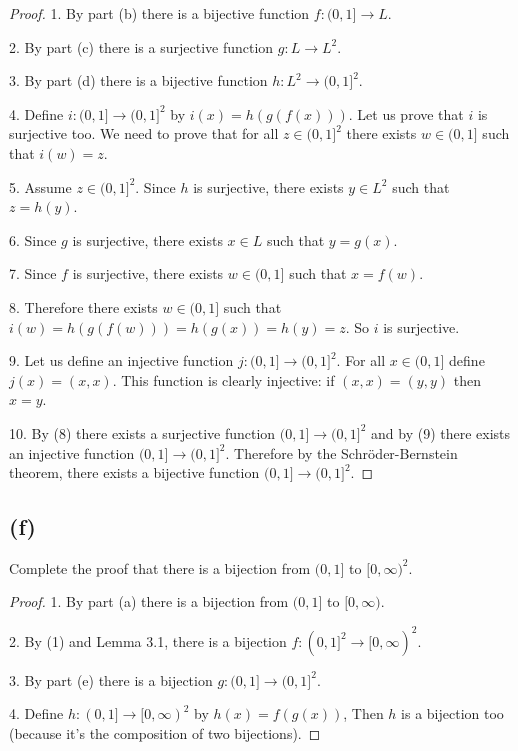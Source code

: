 \documentclass[14pt]{extarticle}
\begin{document}
\begin{proof}
1. By part (b) there is a bijective function $f: (0, 1] \to L$.

2. By part (c) there is a surjective function $g: L \to L^2$.

3. By part (d) there is a bijective function $h: L^2 \to (0,1]^2$.

4. Define $i: (0,1] \to (0,1]^2$ by $i(x) = h(g(f(x)))$. Let us prove that $i$ is surjective too. We need to prove that for all $z \in (0,1]^2$ there exists $w \in (0,1]$ such that $i(w) = z$.

5. Assume $z \in (0,1]^2$. Since $h$ is surjective, there exists $y \in L^2$ such that $z = h(y)$.

6. Since $g$ is surjective, there exists $x \in L$ such that $y = g(x)$.

7. Since $f$ is surjective, there exists $w \in (0,1]$ such that $x = f(w)$.

8. Therefore there exists $w \in (0, 1]$ such that $i(w) = h(g(f(w))) = h(g(x)) = h(y) = z$. So $i$ is surjective.

9. Let us define an injective function $j: (0,1] \to (0,1]^2$. For all $x \in (0,1]$ define $j(x) = (x, x)$. This function is clearly injective: if $(x, x) = (y, y)$ then $x = y$.

10. By (8) there exists a surjective function $(0,1] \to (0,1]^2$ and by (9) there exists an injective function $(0,1] \to (0,1]^2$. Therefore by the Schröder-Bernstein theorem, there exists a bijective function $(0,1] \to (0,1]^2$.
\end{proof}

\subsection{(f)}
Complete the proof that there is a bijection from $(0, 1]$ to $[0, \infty)^2$.

\begin{proof}
1. By part (a) there is a bijection from $(0, 1]$ to $[0, \infty)$.

2. By (1) and Lemma 3.1, there is a bijection $f: (0, 1]^2 \to [0, \infty)^2$.

3. By part (e) there is a bijection $g: (0,1] \to (0,1]^2$.

4. Define $h: (0, 1] \to [0, \infty)^2$ by $h(x) = f(g(x))$, Then $h$ is a bijection too (because it's the composition of two bijections).
\end{proof}
\end{document}
